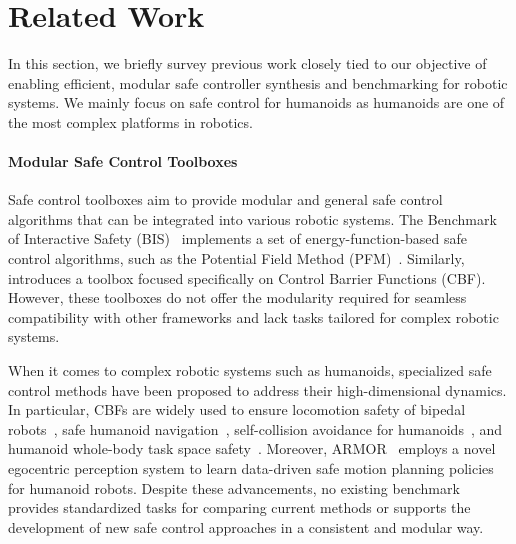 \section{Related Work}  

In this section, we briefly survey previous work closely tied to our objective of enabling efficient, modular safe controller synthesis and benchmarking for robotic systems. We mainly focus on safe control for humanoids as humanoids are one of the most complex platforms in robotics.

\paragraph{Modular Safe Control Toolboxes}  
Safe control toolboxes aim to provide modular and general safe control algorithms that can be integrated into various robotic systems. The Benchmark of Interactive Safety (BIS)~\citep{wei2019safe} implements a set of energy-function-based safe control algorithms, such as the Potential Field Method (PFM)~\citep{khatib1986real}. Similarly, \citep{schoer2024control} introduces a toolbox focused specifically on Control Barrier Functions (CBF). However, these toolboxes do not offer the modularity required for seamless compatibility with other frameworks and lack tasks tailored for complex robotic systems.  

When it comes to complex robotic systems such as humanoids, specialized safe control methods have been proposed to address their high-dimensional dynamics.
In particular, CBFs are widely used to ensure locomotion safety of bipedal robots~\citep{nguyen2015footstepCBF,peng2024real}, safe humanoid navigation~\citep{agrawal2017dcbfnavigation}, self-collision avoidance for humanoids~\citep{khazoom2022humanoid, huang2024whole}, and humanoid whole-body task space safety~\citep{paredes2024wholebodysafe}.
Moreover, ARMOR~\citep{kim2024armor} employs a novel egocentric perception system to learn data-driven safe motion planning policies for humanoid robots.
Despite these advancements, no existing benchmark provides standardized tasks for comparing current methods or supports the development of new safe control approaches in a consistent and modular way.  

